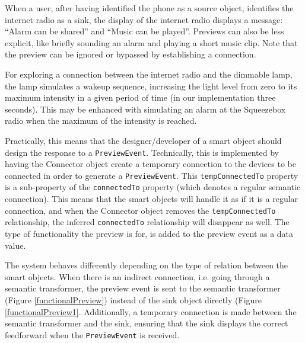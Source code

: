 \begin{example}
\label{phoneToSqueezebox}
When a user, after having identified the phone as a source object, identifies the internet radio as a sink, the display of the internet radio displays a message: ``Alarm can be shared'' and ``Music can be played''. Previews can also be less explicit, like briefly sounding an alarm and playing a short music clip. Note that the preview can be ignored or bypassed by establishing a connection.
\end{example}

\begin{example}
\label{squeezeboxToLamp}
For exploring a connection between the internet radio and the dimmable lamp, the lamp simulates a wakeup sequence, increasing the light level from zero to its maximum intensity in a given period of time (in our implementation three seconds). This may be enhanced with simulating an alarm at the Squeezebox radio when the maximum of the intensity is reached. 
\end{example}

Practically, this means that the designer/developer of a smart object should design the response to  a \texttt{PreviewEvent}. Technically, this is implemented by having the Connector object create a temporary connection to the devices to be connected in order to generate a \texttt{PreviewEvent}. This \texttt{tempConnectedTo} property is a sub-property of the \texttt{connectedTo} property (which denotes a regular semantic connection). This means that the smart objects will handle it as if it is a regular connection, and when the Connector object removes the \texttt{tempConnectedTo} relationship, the inferred \texttt{connectedTo} relationship will disappear as well. The type of functionality the preview is for, is added to the preview event as a data value.

The system behaves differently depending on the type of relation between the smart objects. When there is an indirect connection, i.e. going through a semantic transformer, the preview event is sent to the semantic transformer (Figure \ref{functionalPreview}) instead of the sink object directly (Figure \ref{functionalPreview1}. Additionally, a temporary connection is made between the semantic transformer and the sink, ensuring that the sink displays the correct feedforward when the \texttt{PreviewEvent} is received.


